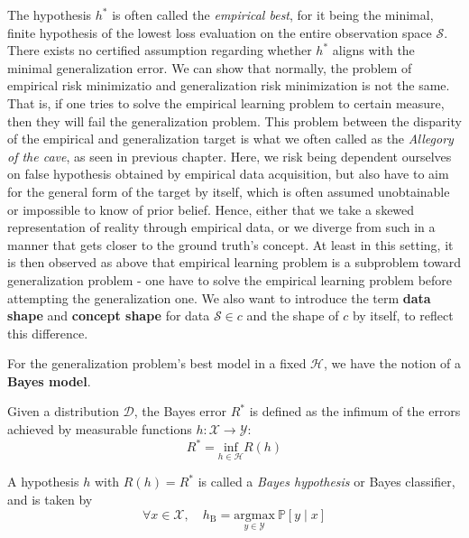 \documentclass[
  journal=largetwo,
  year=2025,
  volume=37,
]{cup-journal}
\begin{document}
The hypothesis $h^{*}$ is often called the \textit{empirical best}, for it being the minimal, finite hypothesis of the lowest loss evaluation on the entire observation space $\mathcal{S}$. There exists no certified assumption regarding whether $h^{*}$ aligns with the minimal generalization error. We can show that normally, the problem of empirical risk minimizatio and generalization risk minimization is not the same. That is, if one tries to solve the empirical learning problem to certain measure, then they will fail the generalization problem. This problem between the disparity of the empirical and generalization target is what we often called as the \textit{Allegory of the cave}, as seen in previous chapter. Here, we risk being dependent ourselves on false hypothesis obtained by empirical data acquisition, but also have to aim for the general form of the target by itself, which is often assumed unobtainable or impossible to know of prior belief. Hence, either that we take a skewed representation of reality through empirical data, or we diverge from such in a manner that gets closer to the ground truth's concept. At least in this setting, it is then observed as above that empirical learning problem is a subproblem toward generalization problem - one have to solve the empirical learning problem before attempting the generalization one. We also want to introduce the term \textbf{data shape} and \textbf{concept shape} for data $\mathcal{S}\in c$ and the shape of $c$ by itself, to reflect this difference. 

For the generalization problem's best model in a fixed $\mathcal{H}$, we have the notion of a \textbf{Bayes model}. %
\begin{definition}
    Given a distribution $\mathcal{D}$, the Bayes error $R^{*}$ is defined as the infimum of the errors achieved by measurable functions $h:\mathcal{X}\to \mathcal{Y}$: 
    \begin{equation}
        R^{*}=\underset{h\in \mathcal{H}}{\mathrm{inf}}R(h)
    \end{equation}
\end{definition}
\begin{definition}
    A hypothesis $h$ with $R(h)=R^{*}$ is called a \textit{Bayes hypothesis} or Bayes classifier, and is taken by \begin{equation}
        \forall x\in \mathcal{X}, \quad h_{\mathrm{B}}=\underset{y\in \mathcal{Y}}{\mathrm{argmax}}\:\mathbb{P}[y\mid x]
    \end{equation} 
\end{definition}
\end{document}
